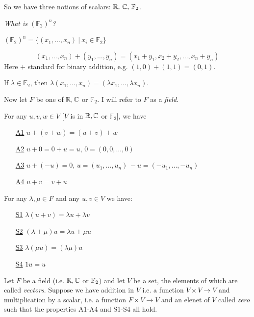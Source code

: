 \documentclass[10pt]{scrartcl}
\begin{document}
So we have three notions of scalars: $\mathbb{R},\,\mathbb{C},\,\mathbb{F}_2$. 


\emph{What is $(\mathbb{F}_2)^n$?}


$(\mathbb{F}_2)^n = \{(x_1,\dots,x_n) ~|~ x_i \in \mathbb{F}_2\}$

\[
  (x_1,\dots,x_n) + (y_1,\dots,y_n) = (x_1 + y_1,x_2+y_2,\dots,x_n+y_n)
\]
Here $+$ standard for binary addition, e.g. $(1,0) + (1,1) = (0,1)$. 

If $\lambda \in \mathbb{F}_2$, then $\lambda(x_1,\dots,x_n) = (\lambda x_1,\dots,\lambda x_n)$. 

Now let $F$ be one of $\mathbb{R}, \mathbb{C}$ or $\mathbb{F}_2$. I will refer to $F$ as a \emph{field}. 


For any $u,v,w \in V$ [$V$ is in $\mathbb{R}, \mathbb{C}$ or $\mathbb{F}_2$], we have 
\begin{enumerate}
\item[\underline{A1}] $u + (v+w) = (u+v) + w$ 
\item[\underline{A2}] $u + 0 = 0 + u = u$, $0 = (0,0,\dots,0)$
\item[\underline{A3}] $u+(-u) = 0$, $u = (u_1,\dots,u_n)\, -u = (-u_1,\dots,-u_n)$
\item[\underline{A4}] $u + v = v+u$
\end{enumerate}\vspace*{10pt}

For any $\lambda, \mu \in F$ and any $u,v \in V$ we have:
\begin{enumerate}
\item[\underline{S1}] $\lambda(u+v) = \lambda u + \lambda v$ 
\item[\underline{S2}] $(\lambda + \mu)u = \lambda u + \mu u$
\item[\underline{S3}] $\lambda(\mu u) = (\lambda \mu) u$
\item[\underline{S4}] $1u = u$
\end{enumerate}\vspace*{10pt}


\begin{definition}
Let $F$ be a field (i.e. $\mathbb{R}, \mathbb{C}$ or $\mathbb{F}_2$) and let $V$ be a set, the elements of which are called \emph{vectors}. Suppose we have addition in $V$ i.e. a function $V \times V \to V$ and multiplication by a scalar, i.e. a function $F \times V \to V$ and an elenet of $V$ called \emph{zero} such that the properties A1-A4 and S1-S4 all hold. 	
\end{definition}
\end{document}
